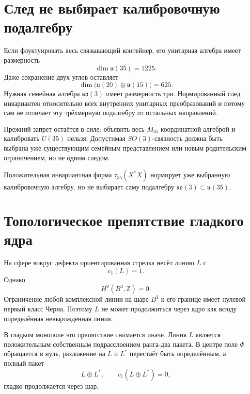\section{След не выбирает калибровочную подалгебру}

Если флуктуировать весь связывающий контейнер, его унитарная алгебра имеет
размерность
\begin{equation}
 \dim\mathfrak u(35)=1225.
\end{equation}
Даже сохранение двух углов оставляет
\begin{equation}
 \dim\bigl(\mathfrak u(20)\oplus\mathfrak u(15)\bigr)=625.
\end{equation}
Нужная семейная алгебра $\mathfrak{so}(3)$ имеет размерность три.
Нормированный след инвариантен относительно всех внутренних унитарных
преобразований и потому сам не отличает эту трёхмерную подалгебру от
остальных направлений.

Прежний запрет остаётся в силе: объявить весь $M_{35}$ координатной
алгеброй и калибровать $U(35)$ нельзя. Допустимая $SO(3)$-связность должна
быть выбрана уже существующим семейным представлением или новым
родительским ограничением, но не одним следом.

\begin{nogocriterion}
Положительная инвариантная форма $\tau_{35}(X^*X)$ нормирует уже выбранную
калибровочную алгебру, но не выбирает саму подалгебру
$\mathfrak{so}(3)\subset\mathfrak u(35)$.
\end{nogocriterion}

\section{Топологическое препятствие гладкого ядра}

На сфере вокруг дефекта ориентированная стрелка несёт линию $L$ с
\begin{equation}
 c_1(L)=1.
\end{equation}
Однако
\begin{equation}
 H^2(B^3,\mathbb Z)=0.
\end{equation}
Ограничение любой комплексной линии на шаре $B^3$ к его границе имеет
нулевой первый класс Черна. Поэтому $L$ не может продолжиться через ядро
как всюду определённая невырожденная линия.

В гладком монополе это препятствие снимается иначе. Линия $L$ является
положительным собственным подрасслоением ранга-два пакета. В центре поле
$\Phi$ обращается в нуль, разложение на $L$ и $L^*$ перестаёт быть
определённым, а полный пакет
\begin{equation}
 L\oplus L^*,
 \qquad c_1(L\oplus L^*)=0,
 \label{eq:v5-hopf-pair-trivial-total-chern}
\end{equation}
гладко продолжается через шар.

